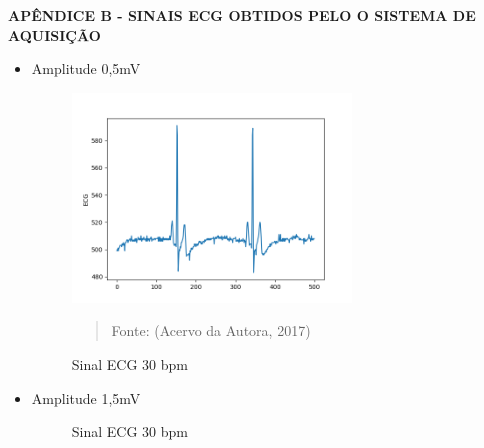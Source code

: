 \documentclass[12pt, a4paper]{article}
\begin{document}
\newpage
\begin{center}
\textbf{APÊNDICE B - SINAIS ECG OBTIDOS PELO O SISTEMA DE AQUISIÇÃO}

\begin{itemize}
\item Amplitude 0,5mV
\begin{figure}[H]
\begin{center}
\caption{Sinal ECG 30 bpm}
					\includegraphics[width=0.7\textwidth]{Figure_1-1.png}
			     \vspace*{\fill} 
            \begin{quote} 
            \centering 
            Fonte: (Acervo da Autora, 2017)
            \end{quote}
            \vspace*{\fill}
			\label{fig:eletrodo}
\end{center}
\end{figure}



\newpage

\item Amplitude 1,5mV

\begin{figure}[H]
\begin{center}
\caption{Sinal ECG 30 bpm}
		

\end{center}
\end{figure}
\end{itemize}
\end{center}
\end{document}
